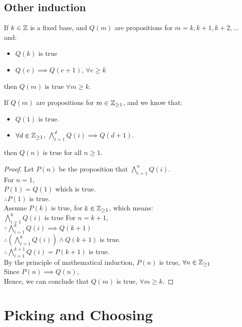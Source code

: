 \documentclass[a4paper]{article}
\begin{document}
\subsection{Other induction}
\begin{thm}
If $k \in \mathbb{Z}$ is a fixed base, and $Q(m)$ are propositions for $m = k, k+1, k+2,...$ and:
\begin{itemize}
	\item $Q(k)$ is true
	\item $Q(e) \implies Q(e+1)$, $\forall e \geq k$
\end{itemize}
then $Q(m)$ is true $\forall m \geq k$.
\end{thm}

\begin{thm}
If $Q(m)$ are propositions for $m \in \mathbb{Z}_{\geq 1}$, and we know that:
\begin{itemize}
	\item $Q(1)$ is true.
	\item $\forall d \in \mathbb{Z}_{\geq 1}$, $\bigwedge^{d}_{i = 1}Q(i) \implies Q(d+1)$.
\end{itemize}
then $Q(n)$ is true for all $n \geq 1$.
\end{thm}
\begin{proof}
Let $P(n)$ be the proposition that $\bigwedge^{n}_{i = 1}Q(i)$.\\
For $n=1$,\\
$P(1) = Q(1)$ which is true.\\
$\therefore P(1)$ is true.\\
Assume $P(k)$ is true, for $k \in \mathbb{Z}_{\geq 1}$, which means:\\
$\bigwedge^{k}_{i = 1}Q(i)$ is true
For $n = k+1$,\\
$\because \bigwedge^{k}_{i = 1}Q(i) \implies Q(k+1)$\\
$\therefore (\bigwedge^{k}_{i = 1}Q(i)) \land Q(k+1)$ is true.\\
$\therefore \bigwedge^{k+1}_{i = 1}Q(i) = P(k+1)$ is true.\\
By the principle of mathematical induction, $P(n)$ is true, $\forall n \in \mathbb{Z}_{\geq 1}$\\
Since $P(n) \implies Q(n)$,\\
Hence, we can conclude that $Q(m)$ is true, $\forall m \geq k$.
\end{proof}

\section{Picking and Choosing}
\end{document}
